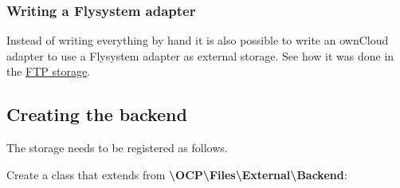 \documentclass[letterpaper,10pt,english]{sphinxmanual}
\begin{document}
\subsubsection{Writing a Flysystem adapter}
\label{app/extstorage:writing-a-flysystem-adapter}
Instead of writing everything by hand it is also possible to write an ownCloud adapter to use
a Flysystem adapter as external storage. See how it was done in the \href{https://github.com/owncloud/files\_external\_ftp/blob/master/lib/Storage/FTP.php\#L27}{FTP storage}.


\subsection{Creating the backend}
\label{app/extstorage:creating-the-backend}
The storage needs to be registered as follows.

Create a class that extends from \textbf{\textbackslash{}OCP\textbackslash{}Files\textbackslash{}External\textbackslash{}Backend}:
\end{document}
